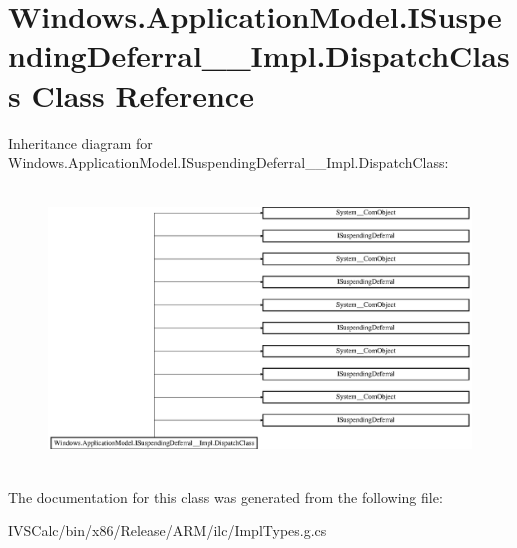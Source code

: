 \hypertarget{class_windows_1_1_application_model_1_1_i_suspending_deferral_____impl_1_1_dispatch_class}{}\section{Windows.\+Application\+Model.\+I\+Suspending\+Deferral\+\_\+\+\_\+\+Impl.\+Dispatch\+Class Class Reference}
\label{class_windows_1_1_application_model_1_1_i_suspending_deferral_____impl_1_1_dispatch_class}
Inheritance diagram for Windows.\+Application\+Model.\+I\+Suspending\+Deferral\+\_\+\+\_\+\+Impl.\+Dispatch\+Class\+:\begin{figure}[H]
\begin{center}
\leavevmode
\includegraphics[height=7.475728cm]{class_windows_1_1_application_model_1_1_i_suspending_deferral_____impl_1_1_dispatch_class}
\end{center}
\end{figure}


The documentation for this class was generated from the following file\+:\begin{DoxyCompactItemize}
\item 
I\+V\+S\+Calc/bin/x86/\+Release/\+A\+R\+M/ilc/Impl\+Types.\+g.\+cs\end{DoxyCompactItemize}
